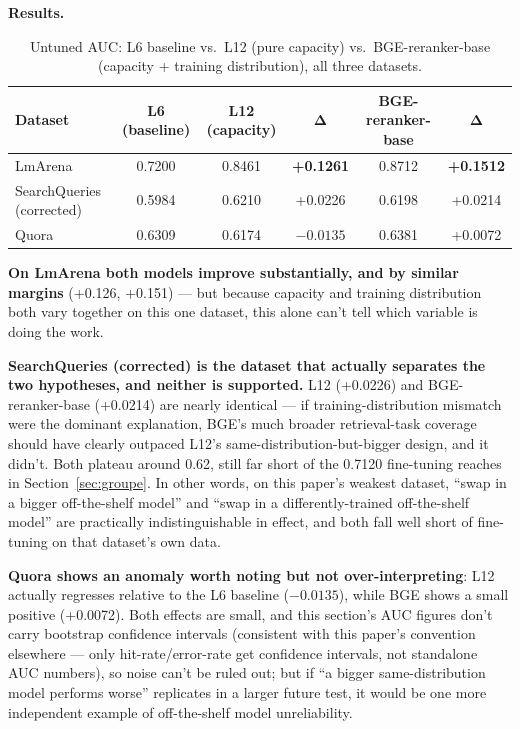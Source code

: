 \documentclass[11pt]{article}
\newenvironment{fittab}{\begin{lrbox}{\fittabbox}}{\end{lrbox}%
  \ifdim\wd\fittabbox>\linewidth\resizebox{\linewidth}{!}{\usebox{\fittabbox}}\else\usebox{\fittabbox}\fi}
\begin{document}
\textbf{Results.}

\begin{table}[h]
\centering
\small
\begin{fittab}\begin{tabular}{@{}lccccc@{}}
\toprule
\textbf{Dataset} & \textbf{L6 (baseline)} & \textbf{L12 (capacity)} & $\bm{\Delta}$ & \textbf{BGE-reranker-base} & $\bm{\Delta}$ \\
\midrule
LmArena & 0.7200 & 0.8461 & \textbf{+0.1261} & 0.8712 & \textbf{+0.1512} \\
SearchQueries (corrected) & 0.5984 & 0.6210 & +0.0226 & 0.6198 & +0.0214 \\
Quora & 0.6309 & 0.6174 & $-0.0135$ & 0.6381 & +0.0072 \\
\bottomrule
\end{tabular}\end{fittab}
\caption{Untuned AUC: L6 baseline vs.\ L12 (pure capacity) vs.\ BGE-reranker-base (capacity + training distribution), all three datasets.}
\end{table}

\textbf{On LmArena both models improve substantially, and by similar margins} (+0.126, +0.151) --- but because capacity and training distribution both vary together on this one dataset, this alone can't tell which variable is doing the work.

\textbf{SearchQueries (corrected) is the dataset that actually separates the two hypotheses, and neither is supported.} L12 (+0.0226) and BGE-reranker-base (+0.0214) are nearly identical --- if training-distribution mismatch were the dominant explanation, BGE's much broader retrieval-task coverage should have clearly outpaced L12's same-distribution-but-bigger design, and it didn't. Both plateau around 0.62, still far short of the 0.7120 fine-tuning reaches in Section~\ref{sec:groupe}. In other words, on this paper's weakest dataset, ``swap in a bigger off-the-shelf model'' and ``swap in a differently-trained off-the-shelf model'' are practically indistinguishable in effect, and both fall well short of fine-tuning on that dataset's own data.

\textbf{Quora shows an anomaly worth noting but not over-interpreting}: L12 actually regresses relative to the L6 baseline ($-0.0135$), while BGE shows a small positive (+0.0072). Both effects are small, and this section's AUC figures don't carry bootstrap confidence intervals (consistent with this paper's convention elsewhere --- only hit-rate/error-rate get confidence intervals, not standalone AUC numbers), so noise can't be ruled out; but if ``a bigger same-distribution model performs worse'' replicates in a larger future test, it would be one more independent example of off-the-shelf model unreliability.
\end{document}
